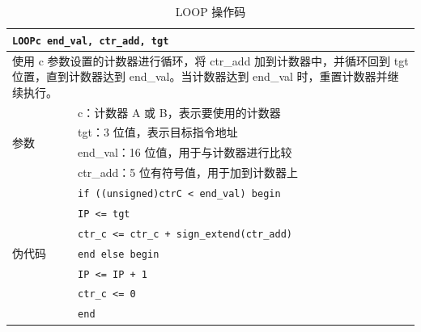 \documentclass[main\_\_CN.tex]{subfiles}
\begin{document}
\begin{table}[H]
\caption{LOOP 操作码}
\label{tab:bitscrm-loop-opcode}
\begin{tabular}{|l|l|}
\hline
\multicolumn{2}{|l|}{\texttt{LOOPc end\_val, ctr\_add, tgt}} \\
\hline
\multicolumn{2}{|L{17cm}|}{使用 c 参数设置的计数器进行循环，将 ctr\_add 加到计数器中，并循环回到 tgt 位置，直到计数器达到 end\_val。当计数器达到 end\_val 时，重置计数器并继续执行。} \\
\hline
\multirow{4}{*}{参数} & c：计数器 A 或 B，表示要使用的计数器 \\
& tgt：3 位值，表示目标指令地址\\
& end\_val：16 位值，用于与计数器进行比较 \\
& ctr\_add：5 位有符号值，用于加到计数器上 \\
\hline
\multirow{7}{*}{伪代码} & \texttt{if ((unsigned)ctrC < end\_val) begin} \\
& \hspace*{4mm} \texttt{IP <= tgt} \\
& \hspace*{4mm} \texttt{ctr\_c <= ctr\_c + sign\_extend(ctr\_add)} \\
& \texttt{end else begin} \\
& \hspace*{4mm} \texttt{IP <= IP + 1} \\
& \hspace*{4mm} \texttt{ctr\_c <= 0} \\
& \texttt{end} \\
\hline
\end{tabular}
\end{table}
\end{document}
